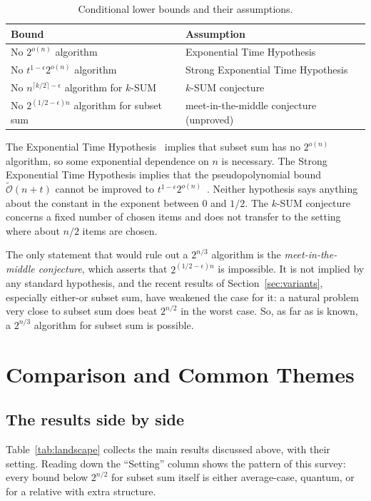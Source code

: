 \documentclass[11pt]{article}
\newcommand{\Ot}{\tilde{\mathcal{O}}}
\begin{document}
\begin{table}[t]
\centering
\caption{Conditional lower bounds and their assumptions.}
\label{tab:lower}
\small
\begin{tabular}{p{6cm}p{7cm}}
\toprule
Bound & Assumption \\
\midrule
No $2^{o(n)}$ algorithm & Exponential Time Hypothesis~\cite{ip} \\
No $t^{1-\epsilon}2^{o(n)}$ algorithm & Strong Exponential Time Hypothesis~\cite{abhs} \\
No $n^{\lceil k/2\rceil-\epsilon}$ algorithm for $k$-SUM & $k$-SUM conjecture \\
No $2^{(1/2-\epsilon)n}$ algorithm for subset sum & meet-in-the-middle conjecture (unproved) \\
\bottomrule
\end{tabular}
\end{table}

The Exponential Time Hypothesis~\cite{ip} implies that subset sum has no
$2^{o(n)}$ algorithm, so some exponential dependence on $n$ is necessary. The
Strong Exponential Time Hypothesis implies that the pseudopolynomial bound
$\Ot(n+t)$ cannot be improved to $t^{1-\epsilon}2^{o(n)}$~\cite{abhs}. Neither
hypothesis says anything about the constant in the exponent between $0$ and
$1/2$. The $k$-SUM conjecture concerns a fixed number of chosen items and does
not transfer to the setting where about $n/2$ items are chosen.

The only statement that would rule out a $2^{n/3}$ algorithm is the
\emph{meet-in-the-middle conjecture}, which asserts that $2^{(1/2-\epsilon)n}$
is impossible. It is not implied by any standard hypothesis, and the recent
results of Section~\ref{sec:variants}, especially either-or subset sum, have
weakened the case for it: a natural problem very close to subset sum does beat
$2^{n/2}$ in the worst case. So, as far as is known, a $2^{n/3}$ algorithm for
subset sum is possible.

\section{Comparison and Common Themes}\label{sec:landscape}

\subsection{The results side by side}
Table~\ref{tab:landscape} collects the main results discussed above, with
their setting. Reading down the ``Setting'' column shows the pattern of this
survey: every bound below $2^{n/2}$ for subset sum itself is either
average-case, quantum, or for a relative with extra structure.
\end{document}
